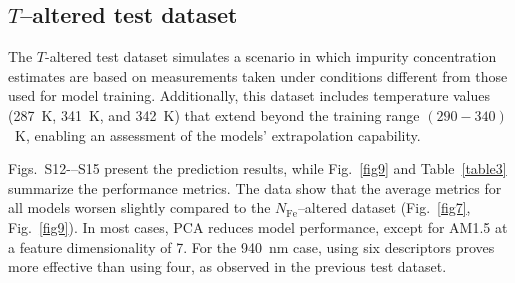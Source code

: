 \documentclass[a4paper,fleqn]{cas-sc}
\begin{document}
\subsection{$T$--altered test dataset}

The $T$-altered test dataset simulates a scenario in which impurity concentration estimates
are based on measurements taken under conditions different from those used for model training.
Additionally, this dataset includes temperature values (287~K, 341~K, and 342~K)
that extend beyond the training range $(290-340)$~K, enabling an assessment of the models' extrapolation capability.

Figs.~S12-–S15 present the prediction results, while Fig.~\ref{fig9} and Table~\ref{table3} summarize the performance metrics.
The data show that the average metrics for all models worsen slightly compared
to the $N_\mathrm{Fe}$--altered dataset (Fig.~\ref{fig7}, Fig.~\ref{fig9}).
In most cases, PCA reduces model performance, except for AM1.5 at a feature dimensionality of 7.
For the 940~nm case, using six descriptors proves more effective than using four, as observed in the previous test dataset.
\end{document}
